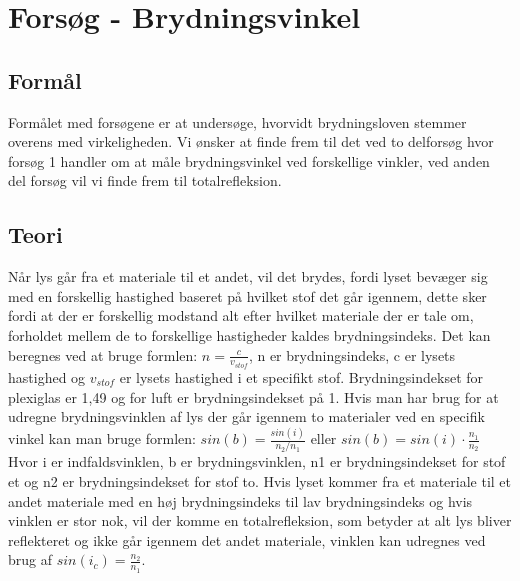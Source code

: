 \section{Forsøg - Brydningsvinkel}
\subsection{Formål}
Formålet med forsøgene er at undersøge, hvorvidt brydningsloven stemmer overens med virkeligheden. Vi ønsker at finde frem til det ved to delforsøg hvor forsøg 1 handler om at måle brydningsvinkel ved forskellige vinkler, ved anden del forsøg vil vi finde frem til totalrefleksion.

\subsection{Teori}
Når lys går fra et materiale til et andet, vil det brydes, fordi lyset bevæger sig med en forskellig hastighed baseret på hvilket stof det går igennem, dette sker fordi at der er forskellig modstand alt efter hvilket materiale der er tale om, forholdet mellem de to forskellige hastigheder kaldes brydningsindeks. Det kan beregnes ved at bruge formlen: \begin{math}n = \frac{c}{v_{stof}}\end{math}, n er brydningsindeks, c er lysets hastighed og \begin{math}v_{stof}\end{math} er lysets hastighed i et specifikt stof. Brydningsindekset for plexiglas er 1,49 og for luft er brydningsindekset på 1. Hvis man har brug for at udregne brydningsvinklen af lys der går igennem to materialer ved en specifik vinkel kan man bruge formlen: \begin{math}sin(b) = \frac{sin(i)}{n_{2}/n_{1}}\end{math} eller \begin{math}sin(b) = sin(i) \cdot \frac{n_{1}}{n_{2}}\end{math}\newline
Hvor i er indfaldsvinklen, b er brydningsvinklen, n1 er brydningsindekset for stof et og n2 er brydningsindekset for stof to.\newline
Hvis lyset kommer fra et materiale til et andet materiale med en høj brydningsindeks til lav brydningsindeks og hvis vinklen er stor nok, vil der komme en totalrefleksion, som betyder at alt lys bliver reflekteret og ikke går igennem det andet materiale, vinklen kan udregnes ved brug af \begin{math}sin(i_{c}) = \frac{n_{2}}{n_{1}}\end{math}.

